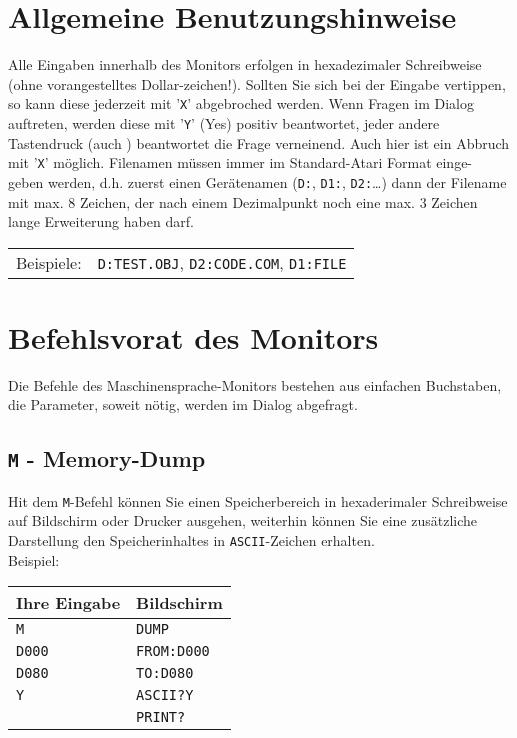 \documentclass[10pt,a4paper,twoside,final,openright,titlepage]{memoir}
\newcommand{\key}[1]{\keystroke{\tiny #1}}
\begin{document}
\section{Allgemeine Benutzungshinweise}

Alle Eingaben innerhalb des Monitors erfolgen in hexadezimaler Schreibweise (ohne vorangestelltes
Dollar-zeichen!). Sollten Sie sich bei der Eingabe vertippen,
so kann diese jederzeit mit '\texttt{X}' abgebroched werden.
Wenn Fragen im Dialog auftreten, werden diese mit '\texttt{Y}'
(Yes) positiv beantwortet, jeder andere Tastendruck
(auch \key{RETURN}) beantwortet die Frage verneinend. Auch
hier ist ein Abbruch mit '\texttt{X}' möglich.
Filenamen müssen immer im Standard-Atari Format einge-
geben werden, d.h. zuerst einen Gerätenamen (\texttt{D:}, \texttt{D1:},
\texttt{D2:}\dots) dann der Filename mit max. 8 Zeichen, der nach
einem Dezimalpunkt noch eine max. 3 Zeichen lange
Erweiterung haben darf.

\begin{tabular}{lp{25em}}
Beispiele: & \texttt{D:TEST.OBJ}, \texttt{D2:CODE.COM}, \texttt{D1:FILE} \\
\end{tabular}

\section{Befehlsvorat des Monitors}

Die Befehle des Maschinensprache-Monitors bestehen aus
einfachen Buchstaben, die Parameter, soweit nötig,
werden im Dialog abgefragt.

\subsection{\texttt{M} - Memory-Dump}

Hit dem \texttt{M}-Befehl können Sie einen Speicherbereich in
hexaderimaler Schreibweise auf Bildschirm oder Drucker
ausgehen, weiterhin können Sie eine zusätz\-liche Darstellung den Speicherinhaltes in \texttt{ASCII}-Zeichen
erhalten.\\

Beispiel: \\

\renewcommand{\arraystretch}{1.2}
\begin{tabular}{p{10em}p{10em}}
Ihre Eingabe	& Bildschirm \\
\hline \texttt{M}		& \texttt{DUMP} \\
\texttt{D000} 	& \texttt{FROM:D000} \\
\texttt{D080}	& \texttt{TO:D080} \\
\texttt{Y}		& \texttt{ASCII?Y} \\
\key{RETURN}	& \texttt{PRINT?} \\
\end{tabular}
\renewcommand{\arraystretch}{1.8}
\bigskip
\end{document}

